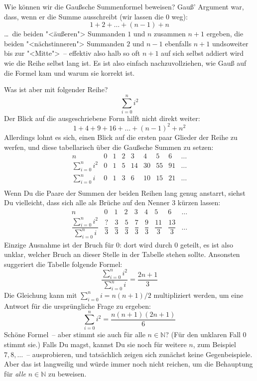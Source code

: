 Wie können wir die Gaußsche Summenformel beweisen?  Gauß' Argument war, dass,
wenn er die Summe ausschreibt (wir lassen die $0$ weg):
%
\[ 1+2+\ldots+(n-1) + n \]
%
\ldots~die beiden "<äußeren"> Summanden $1$ und $n$ zusammen $n+1$
ergeben, die beiden "<nächstinneren"> Summanden $2$ und $n-1$
ebenfalls $n+1$ undsoweiter bis zur "<Mitte">~-- effektiv also halb so
oft $n+1$ auf sich selbst addiert wird wie die Reihe selbst lang ist.
Es ist also einfach nachzuvollziehen, wie Gauß auf die Formel kam und
warum sie korrekt ist.

Was ist aber mit folgender Reihe?
%
\[ \sum_{i=0}^n i^2 \]
%
Der Blick auf die ausgeschriebene Form hilft nicht direkt weiter:
%
\[ 1+4+9+16+\ldots+(n-1)^2+n^2 \]
%
Allerdings lohnt es sich, einen Blick auf die ersten paar Glieder der
Reihe zu werfen, und diese tabellarisch über die Gaußsche Summen zu
setzen:
%
\begin{displaymath}
  \begin{array}{crrrrrrrr}
    n & 0 & 1 & 2 & 3 & 4 & 5 & 6 & \ldots\\\hline
    \sum_{i=0}^n i^2 & 0 & 1 & 5 & 14 & 30 & 55 & 91 & \ldots\\
    \sum_{i=0}^n i   & 0 & 1 & 3 & 6 & 10 & 15 & 21 & \ldots\\
  \end{array}
\end{displaymath}
%
Wenn Du die Paare der Summen der beiden Reihen lang genug anstarrt, siehst
Du vielleicht, dass sich alle als Brüche auf den Nenner $3$ kürzen lassen:
%
\begin{displaymath}
  \begin{array}{crrrrrrrr}
    n & 0 & 1 & 2 & 3 & 4 & 5 & 6 & \ldots\\\hline
    \dfrac{\sum_{i=0}^n i^2}{\sum_{i=0}^n i} & \dfrac{?}{3} & \dfrac{3}{3} &
    \dfrac{5}{3} & \dfrac{7}{3} & \dfrac{9}{3} & \dfrac{11}{3} & \dfrac{13}{3} & \ldots
  \end{array}
\end{displaymath}
%
Einzige Ausnahme ist der Bruch für $0$: dort wird durch $0$ geteilt, es
ist also unklar, welcher Bruch an dieser Stelle in der Tabelle stehen
sollte.  Ansonsten suggeriert die Tabelle folgende Formel:
%
\begin{displaymath}
  \dfrac{\sum_{i=0}^n i^2}{\sum_{i=0}^n i} = \dfrac{2n+1}{3}
\end{displaymath}
%
Die Gleichung kann mit $\sum_{i=0}^n i = n(n+1)/2$ multipliziert werden, um eine
Antwort für die ursprüngliche Frage zu ergeben:
%
\begin{equation}
  \sum_{i=0}^n i^2 = \dfrac{n(n+1)(2n+1)}{6}
  \label{eq:squares-induction-prequel}
\end{equation}
%
Schöne Formel~-- aber stimmt sie auch für alle $n\in\mathbb{N}$?  (Für
den unklaren Fall $0$ stimmt sie.)  Falls Du
magst, kannst Du sie noch für weitere $n$, zum Beispiel $7, 8, \ldots$~-- ausprobieren,
und tatsächlich zeigen sich zunächst keine Gegenbeispiele.  Aber das
ist langweilig und würde immer noch nicht reichen, um die Behauptung
für \emph{alle} $n\in\mathbb{N}$ zu beweisen.

